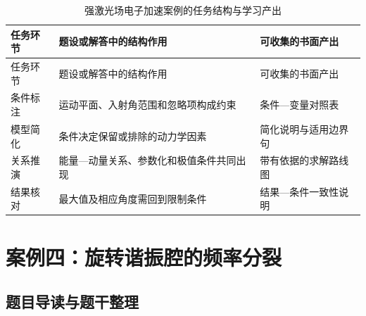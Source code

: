 \documentclass[
  12pt,
  a4paper]{ctexbook}
\begin{document}
\begin{longtable}[]{@{}
  >{\raggedright\arraybackslash}p{}
  >{\raggedright\arraybackslash}p{}
  >{\raggedright\arraybackslash}p{}@{}}
\caption{强激光场电子加速案例的任务结构与学习产出}\tabularnewline
\toprule\noalign{}
\rowcolor{ThesisPale}
\begin{minipage}[b]{\linewidth}\raggedright
任务环节
\end{minipage} & \begin{minipage}[b]{\linewidth}\raggedright
题设或解答中的结构作用
\end{minipage} & \begin{minipage}[b]{\linewidth}\raggedright
可收集的书面产出
\end{minipage} \\
\midrule\noalign{}
\endfirsthead
\toprule\noalign{}
\rowcolor{ThesisPale}
\begin{minipage}[b]{\linewidth}\raggedright
任务环节
\end{minipage} & \begin{minipage}[b]{\linewidth}\raggedright
题设或解答中的结构作用
\end{minipage} & \begin{minipage}[b]{\linewidth}\raggedright
可收集的书面产出
\end{minipage} \\
\midrule\noalign{}
\endhead
\bottomrule\noalign{}
\endlastfoot
条件标注 & 运动平面、入射角范围和忽略项构成约束 & 条件---变量对照表 \\
模型简化 & 条件决定保留或排除的动力学因素 & 简化说明与适用边界句 \\
关系推演 & 能量---动量关系、参数化和极值条件共同出现 &
带有依据的求解路线图 \\
结果核对 & 最大值及相应角度需回到限制条件 & 结果---条件一致性说明 \\
\end{longtable}

\section{案例四：旋转谐振腔的频率分裂}\label{ux6848ux4f8bux56dbux65cbux8f6cux8c10ux632fux8154ux7684ux9891ux7387ux5206ux88c2}

\subsection{题目导读与题干整理}\label{ux9898ux76eeux5bfcux8bfbux4e0eux9898ux5e72ux6574ux7406-3}
\end{document}
